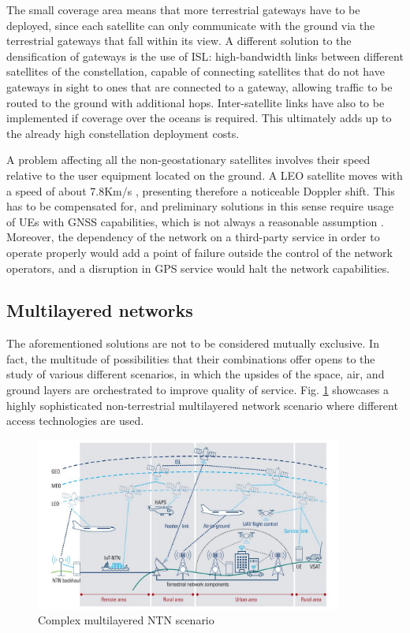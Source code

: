 The small coverage area means that more terrestrial gateways have to be deployed, since each satellite can only communicate with the ground via the terrestrial gateways that fall within its view. A different solution to the densification of gateways is the use of \ac{ISL}: high-bandwidth links between different satellites of the constellation, capable of connecting satellites that do not have gateways in sight to ones that are connected to a gateway, allowing traffic to be routed to the ground with additional hops. Inter-satellite links have also to be implemented if coverage over the oceans is required. This ultimately adds up to the already high constellation deployment costs.

A problem affecting all the non-geostationary satellites involves their speed relative to the user equipment located on the ground. A \ac{LEO} satellite moves with a speed of about 7.8Km/s \cite{leo-definition-theory-facts}, presenting therefore a noticeable Doppler shift. This has to be compensated for, and preliminary solutions in this sense require usage of \ac{UE}s with GNSS capabilities, which is not always a reasonable assumption \cite{satellite-communication-mmwave-giordani, 3gpp-tr-38.821}. Moreover, the dependency of the network on a third-party service in order to operate properly would add a point of failure outside the control of the network operators, and a disruption in GPS service would halt the network capabilities.

\subsection{Multilayered networks}
The aforementioned solutions are not to be considered mutually exclusive. In fact, the multitude of possibilities that their combinations offer opens to the study of various different scenarios, in which the upsides of the space, air, and ground layers are orchestrated to improve quality of service. Fig. \ref{fig:multilayered-ntn} showcases a highly sophisticated non-terrestrial multilayered network scenario where different access technologies are used.

\begin{figure}[ht]
    \centering
    \includegraphics[width=0.9\textwidth]{res/multilayered-ntn.jpg}
    \caption{Complex multilayered \ac{NTN} scenario \cite{connecting-ntn-rohde-schwarz}}
    \label{fig:multilayered-ntn}
\end{figure}

